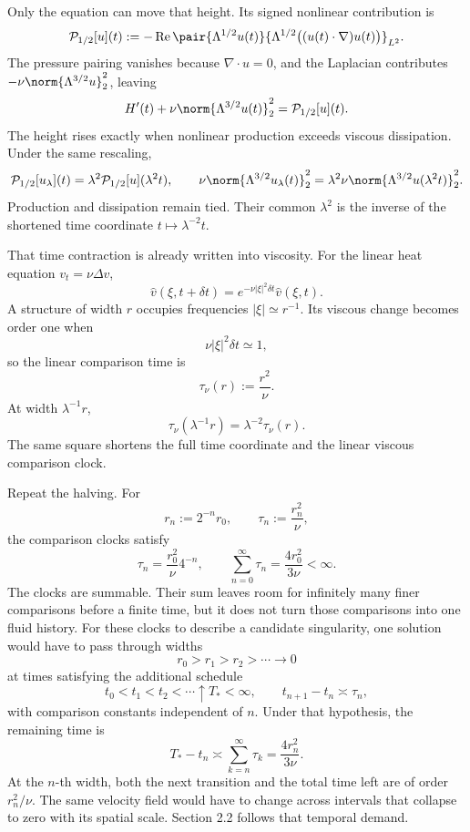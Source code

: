 Only the equation can move that height.
Its signed nonlinear contribution is
\[
  \mathcal P_{1/2}[u](t)
  :=
  -\operatorname{Re}
  \pair
    {\Lambda^{1/2}u(t)}
    {\Lambda^{1/2}\bigl((u(t)\cdot\nabla)u(t)\bigr)}_{L^2}.
\]
The pressure pairing vanishes because \(\nabla\cdot u=0\), and the Laplacian contributes \(-\nu\norm{\Lambda^{3/2}u}_2^2\), leaving
\[
  H'(t)
  +
  \nu\norm{\Lambda^{3/2}u(t)}_2^2
  =
  \mathcal P_{1/2}[u](t).
\]
The height rises exactly when nonlinear production exceeds viscous dissipation.
Under the same rescaling,
\[
  \mathcal P_{1/2}[u_\lambda](t)
  =
  \lambda^2\mathcal P_{1/2}[u](\lambda^2t),
  \qquad
  \nu\norm{\Lambda^{3/2}u_\lambda(t)}_2^2
  =
  \lambda^2\nu\norm{\Lambda^{3/2}u(\lambda^2t)}_2^2.
\]
Production and dissipation remain tied.
Their common \(\lambda^2\) is the inverse of the shortened time coordinate \(t\mapsto\lambda^{-2}t\).


That time contraction is already written into viscosity.
For the linear heat equation \(v_t=\nu\Delta v\),
\[
  \widehat v(\xi,t+\delta t)
  =
  e^{-\nu|\xi|^2\delta t}\widehat v(\xi,t).
\]
A structure of width \(r\) occupies frequencies \(|\xi|\simeq r^{-1}\).
Its viscous change becomes order one when
\[
  \nu|\xi|^2\delta t\simeq1,
\]
so the linear comparison time is
\[
  \tau_\nu(r)
  :=
  \frac{r^2}{\nu}.
\]
At width \(\lambda^{-1}r\),
\[
  \tau_\nu(\lambda^{-1}r)
  =
  \lambda^{-2}\tau_\nu(r).
\]
The same square shortens the full \NavierStokes{} time coordinate and the linear viscous comparison clock.


Repeat the halving.
For
\[
  r_n:=2^{-n}r_0,
  \qquad
  \tau_n:=\frac{r_n^2}{\nu},
\]
the comparison clocks satisfy
\[
  \tau_n
  =
  \frac{r_0^2}{\nu}4^{-n},
  \qquad
  \sum_{n=0}^{\infty}\tau_n
  =
  \frac{4r_0^2}{3\nu}
  <
  \infty.
\]
The clocks are summable.
Their sum leaves room for infinitely many finer comparisons before a finite time, but it does not turn those comparisons into one fluid history.
For these clocks to describe a candidate singularity, one \NavierStokes{} solution would have to pass through widths
\[
  r_0>r_1>r_2>\cdots\longrightarrow0
\]
at times satisfying the additional schedule
\[
  t_0<t_1<t_2<\cdots\uparrow T_*<\infty,
  \qquad
  t_{n+1}-t_n\asymp\tau_n,
\]
with comparison constants independent of \(n\).
Under that hypothesis, the remaining time is
\[
  T_*-t_n
  \asymp
  \sum_{k=n}^{\infty}\tau_k
  =
  \frac{4r_n^2}{3\nu}.
\]
At the \(n\)-th width, both the next transition and the total time left are of order \(r_n^2/\nu\).
The same velocity field would have to change across intervals that collapse to zero with its spatial scale.
Section 2.2 follows that temporal demand.
